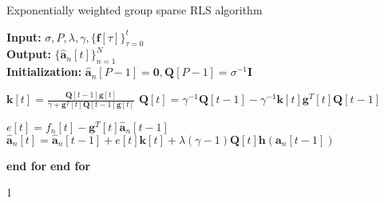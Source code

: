 \documentclass[11pt,final,onecolumn]{IEEEtran}
\def\editmode{1}
\def\bibfilenames{WISENET}
\begin{document}
\begin{itemize}

\begin{algorithm}
	\caption{Exponentially weighted group sparse RLS algorithm }\label{alg:rls}
	\textbf{Input:} $\sigma,P, \lambda, \gamma, \{\bm f[\tau]\}_{\tau =0}^{t} $ \\
	\textbf{Output:} $\{  \hat{\bm a}_n[t]\}_{n=1}^N$ \\
	\textbf{Initialization:} $ \hat{\bm a}_n[P-1]=\bm 0, \bm Q[P-1]= \sigma^{-1} \bm I $ 
	\begin{algorithmic}[1] %
		 
		\State $\displaystyle{\bm k[t]=\frac{ \bm Q [t-1]\bm g[t]}{\gamma+ \bm g^T[t]\bm  Q[t-1]\bm g[t]}}$  
		\State $\bm  Q[t]=\gamma ^{-1} \bm  Q[t-1]- \gamma ^{-1} \bm k[t]\bm g^T[t]\bm  Q[t-1]$ 
		 
		
		\State $\displaystyle{e[t]= f_n[t]-\bm g^T[t]\hat{\bm a}_n[t-1]} $ 
		\State $\hat{\bm a}_n[t]=\hat{\bm a}_n[t-1] + e[t] \bm k[t] + \lambda(\gamma -1) \bm  Q[t]\bm h(\bm a_n[t-1])$ 
		
		\EndFor
		\State \textbf{end for}
		\EndFor
		\State \textbf{end for}
	\end{algorithmic}
\end{algorithm}
\end{itemize}

\if\editmode1 
\onecolumn
\printbibliography
\else

\fi
\end{document}
